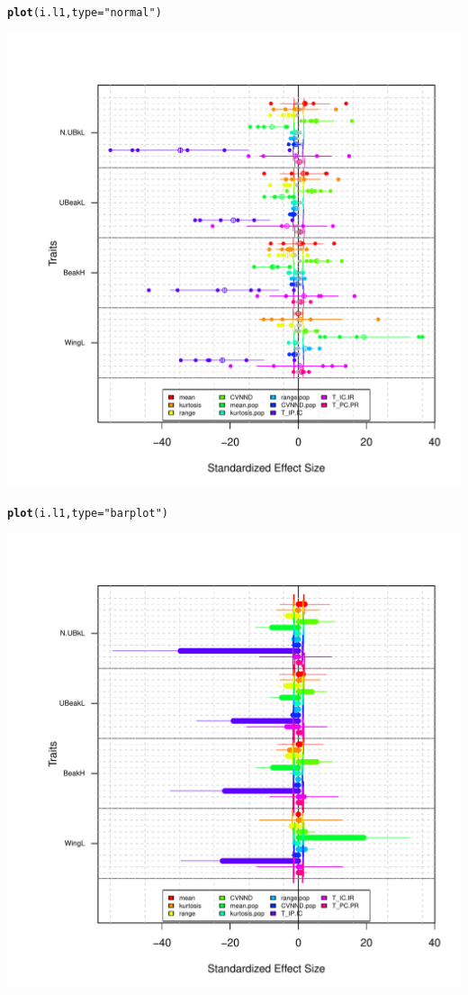 \documentclass[12pt]{article}\usepackage[]{graphicx}\usepackage[]{color}
\makeatletter
\def\maxwidth{ %
  \ifdim\Gin@nat@width>\linewidth
    \linewidth
  \else
    \Gin@nat@width
  \fi
}
\newcommand{\hlstr}[1]{\textcolor[rgb]{0.192,0.494,0.8}{#1}}%
\newcommand{\hlstd}[1]{\textcolor[rgb]{0.345,0.345,0.345}{#1}}%
\newcommand{\hlkwc}[1]{\textcolor[rgb]{0.333,0.667,0.333}{#1}}%
\newcommand{\hlkwd}[1]{\textcolor[rgb]{0.737,0.353,0.396}{\textbf{#1}}}%
\newenvironment{kframe}{%
 \def\at@end@of@kframe{}%
 \ifinner\ifhmode%
  \def\at@end@of@kframe{\end{minipage}}%
  \begin{minipage}{\columnwidth}%
 \fi\fi%
 \def\FrameCommand##1{\hskip\@totalleftmargin \hskip-\fboxsep
 \colorbox{shadecolor}{##1}\hskip-\fboxsep
     \hskip-\linewidth \hskip-\@totalleftmargin \hskip\columnwidth}%
 \MakeFramed {\advance\hsize-\width
   \@totalleftmargin\z@ \linewidth\hsize
   \@setminipage}}%
 {\par\unskip\endMakeFramed%
 \at@end@of@kframe}
\newenvironment{knitrout}{}{} %
\makeatother
\begin{document}
\begin{knitrout}
\begin{kframe}\begin{alltt}
\hlkwd{plot}\hlstd{(i.l1,} \hlkwc{type} \hlstd{=} \hlstr{"normal"}\hlstd{)}
\end{alltt}
\end{kframe}
\includegraphics[width=\maxwidth]{figure/unnamed-chunk-333} 
\begin{kframe}\begin{alltt}
\hlkwd{plot}\hlstd{(i.l1,} \hlkwc{type} \hlstd{=} \hlstr{"barplot"}\hlstd{)}
\end{alltt}
\end{kframe}
\includegraphics[width=\maxwidth]{figure/unnamed-chunk-334} 

\end{knitrout}
\end{document}

